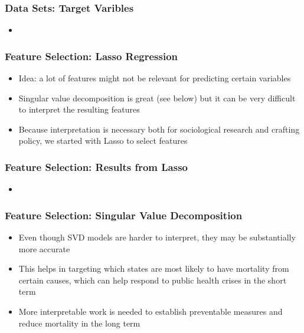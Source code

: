 \documentclass{beamer}
\begin{document}
\begin{frame}

    \frametitle{Data Sets: Target Varibles}

    \uline{}

    \begin{itemize}
        \item
    \end{itemize}

\end{frame}

\begin{frame}

    \frametitle{Feature Selection: Lasso Regression}

    \begin{itemize}
        \item Idea: a lot of features might not be relevant for predicting certain variables
        \item Singular value decomposition is great (see below) but it can be very difficult to interpret the resulting features
        \item Because interpretation is necessary both for sociological research and crafting policy, we started with Lasso to select features
    \end{itemize}

\end{frame}

\begin{frame}

    \frametitle{Feature Selection: Results from Lasso}
    \begin{itemize}
        \item
    \end{itemize}

\end{frame}

\begin{frame}

    \frametitle{Feature Selection: Singular Value Decomposition}
    \begin{itemize}
        \item Even though SVD models are harder to interpret, they may be substantially more accurate
        \item This helps in targeting which states are most likely to have mortality from certain causes, which can help respond to public health crises in the short term
        \item More interpretable work is needed to establish preventable measures and reduce mortality in the long term
    \end{itemize}

\end{frame}
\end{document}
